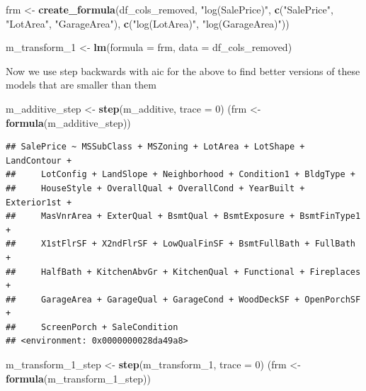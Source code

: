 \documentclass[
]{article}
\newenvironment{Shaded}{\begin{snugshade}}{\end{snugshade}}
\newcommand{\DataTypeTok}[1]{\textcolor[rgb]{0.13,0.29,0.53}{#1}}
\newcommand{\DecValTok}[1]{\textcolor[rgb]{0.00,0.00,0.81}{#1}}
\newcommand{\KeywordTok}[1]{\textcolor[rgb]{0.13,0.29,0.53}{\textbf{#1}}}
\newcommand{\NormalTok}[1]{#1}
\newcommand{\StringTok}[1]{\textcolor[rgb]{0.31,0.60,0.02}{#1}}
\begin{document}
\begin{Shaded}
\begin{Highlighting}[]
\NormalTok{frm <-}\StringTok{ }\KeywordTok{create_formula}\NormalTok{(df_cols_removed, }\StringTok{"log(SalePrice)"}\NormalTok{, }\KeywordTok{c}\NormalTok{(}\StringTok{"SalePrice"}\NormalTok{, }\StringTok{"LotArea"}\NormalTok{, }\StringTok{"GarageArea"}\NormalTok{), }\KeywordTok{c}\NormalTok{(}\StringTok{"log(LotArea)"}\NormalTok{, }\StringTok{"log(GarageArea)"}\NormalTok{))}

\NormalTok{m_transform_}\DecValTok{1}\NormalTok{ <-}\StringTok{ }\KeywordTok{lm}\NormalTok{(}\DataTypeTok{formula =}\NormalTok{ frm, }\DataTypeTok{data =}\NormalTok{ df_cols_removed)}
\end{Highlighting}
\end{Shaded}

Now we use step backwards with aic for the above to find better versions of these models that are smaller than them

\begin{Shaded}
\begin{Highlighting}[]
\NormalTok{m_additive_step <-}\StringTok{ }\KeywordTok{step}\NormalTok{(m_additive, }\DataTypeTok{trace =} \DecValTok{0}\NormalTok{)}
\NormalTok{(frm <-}\StringTok{ }\KeywordTok{formula}\NormalTok{(m_additive_step))}
\end{Highlighting}
\end{Shaded}

\begin{verbatim}
## SalePrice ~ MSSubClass + MSZoning + LotArea + LotShape + LandContour + 
##     LotConfig + LandSlope + Neighborhood + Condition1 + BldgType + 
##     HouseStyle + OverallQual + OverallCond + YearBuilt + Exterior1st + 
##     MasVnrArea + ExterQual + BsmtQual + BsmtExposure + BsmtFinType1 + 
##     X1stFlrSF + X2ndFlrSF + LowQualFinSF + BsmtFullBath + FullBath + 
##     HalfBath + KitchenAbvGr + KitchenQual + Functional + Fireplaces + 
##     GarageArea + GarageQual + GarageCond + WoodDeckSF + OpenPorchSF + 
##     ScreenPorch + SaleCondition
## <environment: 0x0000000028da49a8>
\end{verbatim}

\begin{Shaded}
\begin{Highlighting}[]
\NormalTok{m_transform_}\DecValTok{1}\NormalTok{_step <-}\StringTok{ }\KeywordTok{step}\NormalTok{(m_transform_}\DecValTok{1}\NormalTok{, }\DataTypeTok{trace =} \DecValTok{0}\NormalTok{)}
\NormalTok{(frm <-}\StringTok{ }\KeywordTok{formula}\NormalTok{(m_transform_}\DecValTok{1}\NormalTok{_step))}
\end{Highlighting}
\end{Shaded}
\end{document}
